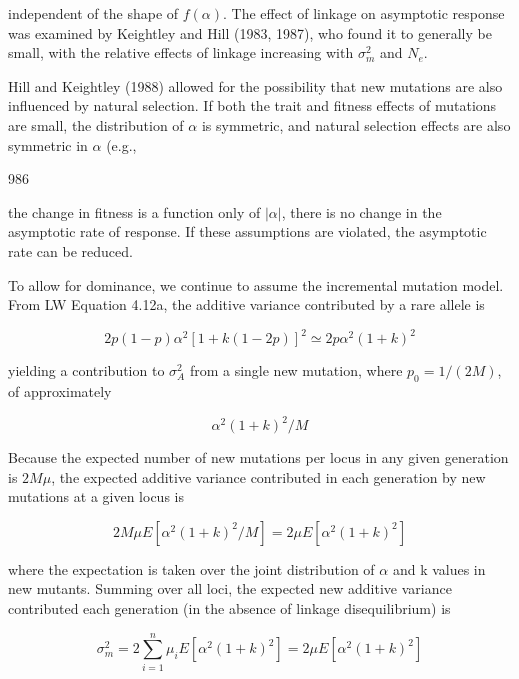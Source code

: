 \documentclass{article}
\begin{document}
{independent of the shape of  $ f(\alpha) $. The effect of linkage on asymptotic response was examined by Keightley and Hill (1983, 1987), who found it to generally be small, with the relative effects of linkage increasing with  $ \sigma_{m}^{2} $ and  $ N_{e} $.

Hill and Keightley (1988) allowed for the possibility that new mutations are also influenced by natural selection. If both the trait and fitness effects of mutations are small, the distribution of  $ \alpha $ is symmetric, and natural selection effects are also symmetric in  $ \alpha $ (e.g.,

986

the change in fitness is a function only of  $ |\alpha| $, there is no change in the asymptotic rate of response. If these assumptions are violated, the asymptotic rate can be reduced.

To allow for dominance, we continue to assume the incremental mutation model. From LW Equation 4.12a, the additive variance contributed by a rare allele is

\begin{equation}
2p(1-p)\alpha^{2}[1+k(1-2p)]^{2}\simeq2p\alpha^{2}(1+k)^{2}
\end{equation}

yielding a contribution to  $ \sigma_{A}^{2} $ from a single new mutation, where  $ p_{0}=1/(2M) $, of approximately

\begin{equation}
\alpha^{2}(1+k)^{2}/M
\end{equation}

Because the expected number of new mutations per locus in any given generation is  $ 2M\mu $, the expected additive variance contributed in each generation by new mutations at a given locus is

\begin{equation}
2M\mu E[\alpha^{2}(1+k)^{2}/M]=2\mu E[\alpha^{2}(1+k)^{2}]
\end{equation}

where the expectation is taken over the joint distribution of  $ \alpha $ and k values in new mutants. Summing over all loci, the expected new additive variance contributed each generation (in the absence of linkage disequilibrium) is

\begin{equation}
\sigma_{m}^{2}=2\sum_{i=1}^{n}\mu_{i}E[\alpha^{2}(1+k)^{2}]=2\mu E[\alpha^{2}(1+k)^{2}]
\tag{26.34a}
\label{eq:26_34a}
\end{equation}

}
\end{document}
